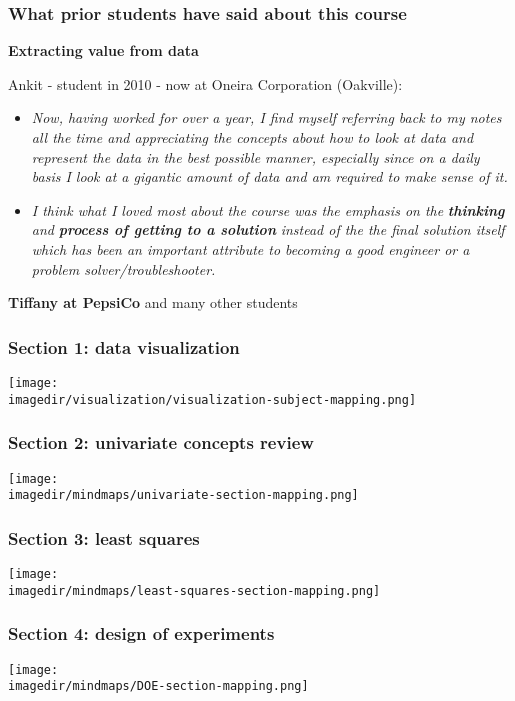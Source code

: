 \begin{frame}\frametitle{What prior students have said about this course}

	\textbf{Extracting value from data}

	Ankit - student in 2010 - now at Oneira Corporation (Oakville):
	\begin{itemize}
		\item	\emph{Now, having worked for over a year, I find myself referring back to my notes all the time and appreciating the concepts about how to look at data and represent the data in the best possible manner, especially since on a daily basis I look at a gigantic amount of data and am required to make sense of it.}
	\end{itemize}
	\begin{itemize}
		\item	\emph{I think what I loved most about the course was the emphasis on the} \textbf{\emph{thinking}} \emph{and} \textbf{\emph{process of getting to a solution}} \emph{instead of the the final solution itself which has been an important attribute to becoming a good engineer or a problem solver/troubleshooter.}
	\end{itemize}

	\vspace{12pt}
	\textbf{Tiffany at PepsiCo} and many other students
\end{frame}

\begin{frame}\frametitle{Section 1: data visualization}
	\texttt{[image: \\imagedir/visualization/visualization-subject-mapping.png]}
\end{frame}

\begin{frame}\frametitle{Section 2: univariate concepts review}

	\texttt{[image: \\imagedir/mindmaps/univariate-section-mapping.png]}
\end{frame}

\begin{frame}\frametitle{Section 3: least squares}

	\texttt{[image: \\imagedir/mindmaps/least-squares-section-mapping.png]}
\end{frame}

\begin{frame}\frametitle{Section 4: design of experiments}

	\texttt{[image: \\imagedir/mindmaps/DOE-section-mapping.png]}
\end{frame}

